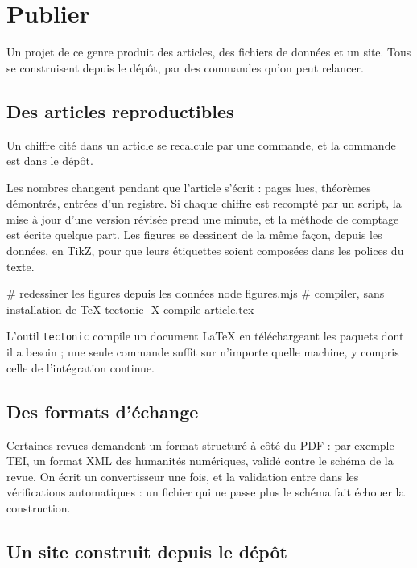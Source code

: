 \chapter{Publier}\label{ch:publier}

Un projet de ce genre produit des articles, des fichiers de données et un site. Tous se
construisent depuis le dépôt, par des commandes qu'on peut relancer.

\section{Des articles reproductibles}

\begin{regle}
Un chiffre cité dans un article se recalcule par une commande, et la commande est dans le
dépôt.
\end{regle}

Les nombres changent pendant que l'article s'écrit : pages lues, théorèmes démontrés,
entrées d'un registre. Si chaque chiffre est recompté par un script, la mise à jour d'une
version révisée prend une minute, et la méthode de comptage est écrite quelque part. Les
figures se dessinent de la même façon, depuis les données, en TikZ, pour que leurs
étiquettes soient composées dans les polices du texte.

\begin{terminal}
# redessiner les figures depuis les données
node figures.mjs
# compiler, sans installation de TeX
tectonic -X compile article.tex
\end{terminal}

L'outil \texttt{tectonic} compile un document LaTeX en téléchargeant les paquets dont il
a besoin ; une seule commande suffit sur n'importe quelle machine, y compris celle de
l'intégration continue.

\section{Des formats d'échange}

Certaines revues demandent un format structuré à côté du PDF : par exemple TEI, un format
XML des humanités numériques, validé contre le schéma de la revue. On écrit un convertisseur
une fois, et la validation entre dans les vérifications automatiques : un fichier qui ne
passe plus le schéma fait échouer la construction.

\section{Un site construit depuis le dépôt}

